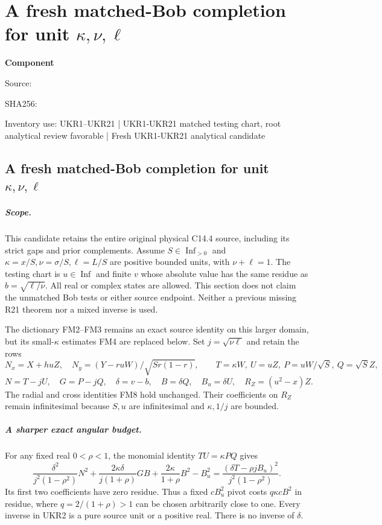 \chapter{A fresh matched-Bob completion for unit $\kappa,\nu,\ell$}
\label{component:pd26b89cdb3f0}
\noindent\textbf{Component }\par
{\small\noindent Source: \par}
{\small\noindent SHA256: \par}
{\small\noindent Inventory use: UKR1--UKR21 | UKR1-UKR21 matched testing chart, root analytical review favorable | Fresh UKR1-UKR21 analytical candidate\par}
\medskip
\section{A fresh matched-Bob completion for unit $\kappa,\nu,\ell$}
\label{pd26b89cdb3f0:sec:new-c144-unit-kappa-matched}

\paragraph{Scope.}
This candidate retains the entire original physical C14.4 source,
including its strict gaps and prior complements. Assume
$S\in\operatorname{Inf}_{>0}$ and $\kappa=x/S,\nu=\sigma/S,
\ell=L/S$ are positive bounded units, with $\nu+\ell=1$.
The testing chart is $u\in\operatorname{Inf}$ and finite $v$
whose absolute value has the same residue as
$b=\sqrt{\ell/\nu}$. All real or complex states are allowed.
This section does not claim the unmatched Bob tests or either
source endpoint. Neither a previous missing R21 theorem nor a
mixed inverse is used.

The dictionary FM2--FM3 remains an exact source identity on this
larger domain, but its small-$\kappa$ estimates FM4 are replaced
below. Set $j=\sqrt{\nu\ell}$ and retain the rows
\[
 N_x=X+huZ,\quad N_y=(Y-ruW)/\sqrt{Sr(1-r)},\qquad
 T=\kappa W,\ U=uZ,\ P=uW/\sqrt S,\ Q=\sqrt S Z,
\]
\[
 N=T-jU,\quad G=P-jQ,\quad \delta=v-b,\quad
 B=\delta Q,\quad B_u=\delta U,\quad R_Z=(u^2-x)Z.
 \tag{UKR1}
\]
The radial and cross identities FM8 hold unchanged. Their
coefficients on $R_Z$ remain infinitesimal because $S,u$ are
infinitesimal and $\kappa,1/j$ are bounded.

\paragraph{A sharper exact angular budget.}
For any fixed real $0<\rho<1$, the monomial identity $TU=\kappa PQ$
gives
\[
 \frac{\delta^2}{j^2(1-\rho^2)}N^2+
 \frac{2\kappa\delta}{j(1+\rho)}GB+
 \frac{2\kappa}{1+\rho}B^2-B_u^2
   =\frac{(\delta T-\rho jB_u)^2}{j^2(1-\rho^2)}.
 \tag{UKR2}
\]
Its first two coefficients have zero residue. Thus a fixed
$cB_u^2$ pivot costs $q\kappa cB^2$ in residue, where
$q=2/(1+\rho)>1$ can be chosen arbitrarily close to one.
Every inverse in UKR2 is a pure source unit or a positive real.
There is no inverse of $\delta$.

